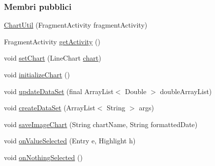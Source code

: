 \subsubsection*{Membri pubblici}
\begin{DoxyCompactItemize}
\item 
\hyperlink{classit_1_1unibo_1_1torsello_1_1bluetoothpositioning_1_1util_1_1ChartUtil_a255b439c7574dc7858355e3fc71ca6f7_a255b439c7574dc7858355e3fc71ca6f7}{Chart\+Util} (Fragment\+Activity fragment\+Activity)
\item 
Fragment\+Activity \hyperlink{classit_1_1unibo_1_1torsello_1_1bluetoothpositioning_1_1util_1_1ChartUtil_a59150a6d20b6d0ad2fcf8c1ba858d355_a59150a6d20b6d0ad2fcf8c1ba858d355}{get\+Activity} ()
\item 
void \hyperlink{classit_1_1unibo_1_1torsello_1_1bluetoothpositioning_1_1util_1_1ChartUtil_a26e84414723ff1ca38d8f2907ed3322e_a26e84414723ff1ca38d8f2907ed3322e}{set\+Chart} (Line\+Chart \hyperlink{classit_1_1unibo_1_1torsello_1_1bluetoothpositioning_1_1util_1_1ChartUtil_a6c34176fdfb85bac1d3aa1529b49ad5f_a6c34176fdfb85bac1d3aa1529b49ad5f}{chart})
\item 
void \hyperlink{classit_1_1unibo_1_1torsello_1_1bluetoothpositioning_1_1util_1_1ChartUtil_aab1a6bd41cbf8228c53d633af6b89bb7_aab1a6bd41cbf8228c53d633af6b89bb7}{initialize\+Chart} ()
\item 
void \hyperlink{classit_1_1unibo_1_1torsello_1_1bluetoothpositioning_1_1util_1_1ChartUtil_aa9bda04d2c2058fb1b3fcd72c5a7471d_aa9bda04d2c2058fb1b3fcd72c5a7471d}{update\+Data\+Set} (final Array\+List$<$ Double $>$ double\+Array\+List)
\item 
void \hyperlink{classit_1_1unibo_1_1torsello_1_1bluetoothpositioning_1_1util_1_1ChartUtil_a7460cb57f8ad402dc522b592bc40f7b2_a7460cb57f8ad402dc522b592bc40f7b2}{create\+Data\+Set} (Array\+List$<$ String $>$ args)
\item 
void \hyperlink{classit_1_1unibo_1_1torsello_1_1bluetoothpositioning_1_1util_1_1ChartUtil_afdbdcf15b073da5b03613dbccc7681a9_afdbdcf15b073da5b03613dbccc7681a9}{save\+Image\+Chart} (String chart\+Name, String formatted\+Date)
\item 
void \hyperlink{classit_1_1unibo_1_1torsello_1_1bluetoothpositioning_1_1util_1_1ChartUtil_a7f7609b8236d269e4f272f717b0b0294_a7f7609b8236d269e4f272f717b0b0294}{on\+Value\+Selected} (Entry e, Highlight h)
\item 
void \hyperlink{classit_1_1unibo_1_1torsello_1_1bluetoothpositioning_1_1util_1_1ChartUtil_a7e7f15aebf87926e19bc9e1ece289fde_a7e7f15aebf87926e19bc9e1ece289fde}{on\+Nothing\+Selected} ()
\end{DoxyCompactItemize}
